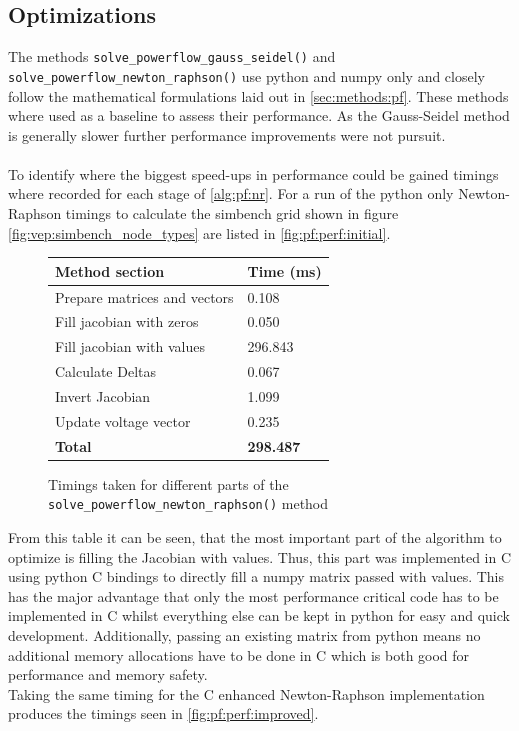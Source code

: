 \subsection{Optimizations}


The methods \texttt{solve\_powerflow\_gauss\_seidel()}
and \texttt{solve\_powerflow\_newton\_raphson()}
use python and numpy only and closely follow the mathematical formulations laid out in
\autoref{sec:methods:pf}.
These methods where used as a baseline to assess their performance.
As the Gauss-Seidel method is generally slower further performance improvements
were not pursuit.\\
\\
To identify where the biggest
speed-ups in performance could be gained timings where recorded for each stage of
\autoref{alg:pf:nr}.
For a run of the python only Newton-Raphson timings to calculate the simbench grid shown in figure
\ref{fig:vep:simbench_node_types} are listed in \autoref{fig:pf:perf:initial}.


\begin{figure}[H]
    \begin{center}
        \begin{tabular}{ll}
            \textbf{Method section} & \textbf{Time (ms)}\\
            \hline
            Prepare matrices and vectors & 0.108\\
            Fill jacobian with zeros &  0.050\\
            Fill jacobian with values & 296.843\\
            Calculate Deltas &      0.067\\
            Invert Jacobian &      1.099\\
            Update voltage vector & 0.235\\
            \hline
            \textbf{Total} & \textbf{298.487}
        \end{tabular}
    \end{center}
\caption{Timings taken for different parts of the \texttt{solve\_powerflow\_newton\_raphson()} method}
\label{fig:pf:perf:initial}
\end{figure}
    
From this table it can be seen, that the most important part
of the algorithm to optimize is filling the Jacobian with values. Thus, this
part was implemented in C using python C bindings to directly fill a numpy
matrix passed with values. This has the major advantage that only the most performance
critical code has to be implemented in C whilst everything else can be kept in python
for easy and quick development. Additionally, passing an existing matrix from python
means no additional memory allocations have to be done in C which is both good for performance 
and memory safety.\\
Taking the same timing for the C enhanced Newton-Raphson implementation produces the timings
seen in \autoref{fig:pf:perf:improved}.

